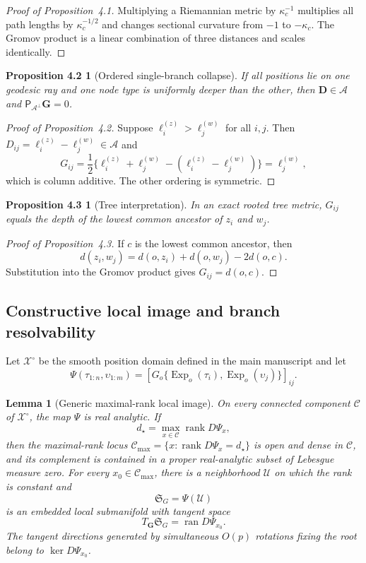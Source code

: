 \documentclass[
  12pt]{article}
\newtheorem{lemma}{Lemma}[section]
\theoremstyle{definition}
\theoremstyle{plain}
\newtheorem*{mainpropcollapse}{Proposition 4.2}
\newtheorem*{mainproptree}{Proposition 4.3}
\newcommand{\calA}{\mathcal A}
\newcommand{\calC}{\mathcal C}
\newcommand{\calX}{\mathcal X}
\newcommand{\projA}{\mathsf P_{\calA^\perp}}
\newcommand{\bD}{\mathbf D}
\newcommand{\bG}{\mathbf G}
\DeclareMathOperator{\Exp}{Exp}
\begin{document}
\begin{proof}[Proof of Proposition~4.1]
	Multiplying a Riemannian metric by $\kappa_c^{-1}$ multiplies all path lengths by $\kappa_c^{-1/2}$ and changes sectional curvature from $-1$ to $-\kappa_c$. The Gromov product is a linear combination of three distances and scales identically.
\end{proof}

\begin{mainpropcollapse}[Ordered single-branch collapse]
	If all positions lie on one geodesic ray and one node type is uniformly deeper than the other, then $\bD\in\calA$ and $\projA\bG=0$.
\end{mainpropcollapse}

\begin{proof}[Proof of Proposition~4.2]
	Suppose $\ell_i^{(z)}>\ell_j^{(w)}$ for all $i,j$. Then $D_{ij}=\ell_i^{(z)}-\ell_j^{(w)}\in\calA$ and
	\[
	G_{ij}=\frac12\{\ell_i^{(z)}+\ell_j^{(w)}-(\ell_i^{(z)}-\ell_j^{(w)})\}=\ell_j^{(w)},
	\]
	which is column additive. The other ordering is symmetric.
\end{proof}

\begin{mainproptree}[Tree interpretation]
	In an exact rooted tree metric, $G_{ij}$ equals the depth of the lowest common ancestor of $z_i$ and $w_j$.
\end{mainproptree}

\begin{proof}[Proof of Proposition~4.3]
	If $c$ is the lowest common ancestor, then
	\[
	d(z_i,w_j)=d(o,z_i)+d(o,w_j)-2d(o,c).
	\]
	Substitution into the Gromov product gives $G_{ij}=d(o,c)$.
\end{proof}

\subsection{Constructive local image and branch resolvability}

Let $\calX^\circ$ be the smooth position domain defined in the main manuscript and let
\[
\Psi(\tau_{1:n},\upsilon_{1:m})=
\left[G_o\{\Exp_o(\tau_i),\Exp_o(\upsilon_j)\}\right]_{ij}.
\]

\begin{lemma}[Generic maximal-rank local image]
	\label{supp:localimage}
	On every connected component $\calC$ of $\calX^\circ$, the map $\Psi$ is real analytic. If
	\[
	d_\star=\max_{x\in\calC}\operatorname{rank}D\Psi_x,
	\]
	then the maximal-rank locus $\calC_{\max}=\{x:\operatorname{rank}D\Psi_x=d_\star\}$ is open and dense in $\calC$, and its complement is contained in a proper real-analytic subset of Lebesgue measure zero. For every $x_0\in\calC_{\max}$, there is a neighborhood $\mathcal U$ on which the rank is constant and
	\[
	\mathfrak S_G=\Psi(\mathcal U)
	\]
	is an embedded local submanifold with tangent space
	\[
	T_{\bG}\mathfrak S_G=\operatorname{ran}D\Psi_{x_0}.
	\]
	The tangent directions generated by simultaneous $O(p)$ rotations fixing the root belong to $\ker D\Psi_{x_0}$.
\end{lemma}
\end{document}
